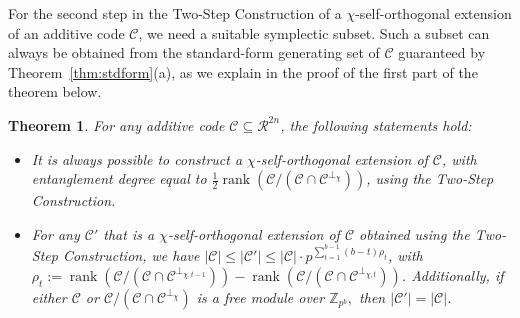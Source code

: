 \documentclass{article}
\DeclareMathOperator{\rank}{rank}
\newtheorem{thm}{Theorem}[section]
\theoremstyle{remark}
\theoremstyle{definition}
\numberwithin{equation}{section}
\begin{document}
For the second step in the Two-Step Construction of a $\chi$-self-orthogonal extension of an additive code $\mathcal{C}$, we need a suitable symplectic subset. Such a subset can always be obtained from the standard-form generating set of $\mathcal{C}$ guaranteed by Theorem~\ref{thm:stdform}(a), as we explain in the proof of the first part of the theorem below.
  
  \begin{thm}\label{thm:2step}  For any additive code $\mathcal{C} \subseteq \mathcal{R}^{2n}$, the following statements hold:
  \begin{itemize}
  \item[(a)] It is always possible to construct a $\chi$-self-orthogonal extension of $\mathcal{C}$, with entanglement degree equal to $\frac12 \rank(\mathcal{C}/(\mathcal{C} \cap \mathcal{C}^{\perp_\chi}))$, using the Two-Step Construction. 
  \item[(b)]  For any $\mathcal{C}'$ that is a $\chi$-self-orthogonal extension of $\mathcal{C}$ obtained using the Two-Step Construction, we have $|\mathcal{C}|  \leq |\mathcal{C}'| \leq |\mathcal{C}| \cdot p^{\sum_{t=1}^{b-1} (b-t)  \rho_t}$, with $\rho_t:=\rank(\mathcal{C}/(\mathcal{C} \cap \mathcal{C}^{\perp_{\chi,t-1}}))-\rank(\mathcal{C}/(\mathcal{C} \cap \mathcal{C}^{\perp_{\chi,t}}))$. Additionally, if either $\mathcal{C}$ or $\mathcal{C}/(\mathcal{C} \cap \mathcal{C}^{\perp_\chi})$ is a free module over $\mathbb{Z}_{p^b},$ then $|\mathcal{C}'| =|\mathcal{C}|$.
  \end{itemize}
\end{thm}
\end{document}

